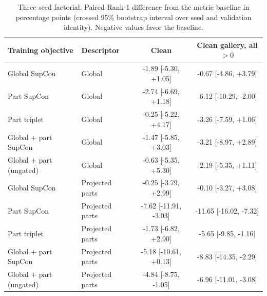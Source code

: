 \begin{table}[!htbp]
\centering
\caption{Three-seed factorial. Paired Rank-1 difference from the metric baseline in percentage points
(crossed 95\% bootstrap interval over seed and validation identity).
Negative values favor the baseline.}
\label{tab:s-factorial-paired}
\small
\setlength{\tabcolsep}{4pt}
\begin{tabularx}{\textwidth}{@{}>{\raggedright\arraybackslash}Xlcc@{}}
\toprule
Training objective & Descriptor & Clean & \shortstack{Clean gallery,\\all $>0$} \\
\midrule
Global SupCon & Global & -1.89 [-5.30, +1.05] & -0.67 [-4.86, +3.79] \\
Part SupCon & Global & -2.74 [-6.69, +1.18] & -6.12 [-10.29, -2.00] \\
Part triplet & Global & -0.25 [-5.22, +4.17] & -3.26 [-7.59, +1.06] \\
Global + part SupCon & Global & -1.47 [-5.85, +3.03] & -3.21 [-8.97, +2.89] \\
Global + part (ungated) & Global & -0.63 [-5.35, +5.30] & -2.19 [-5.35, +1.11] \\
Global SupCon & Projected parts & -0.25 [-3.79, +2.99] & -0.10 [-3.27, +3.08] \\
Part SupCon & Projected parts & -7.62 [-11.91, -3.03] & -11.65 [-16.02, -7.32] \\
Part triplet & Projected parts & -1.73 [-6.82, +2.90] & -5.65 [-9.85, -1.16] \\
Global + part SupCon & Projected parts & -5.18 [-10.61, +0.13] & -8.83 [-14.35, -2.29] \\
Global + part (ungated) & Projected parts & -4.84 [-8.75, -1.05] & -6.96 [-11.01, -3.08] \\
\bottomrule
\end{tabularx}
\vspace{0.5em}


\end{table}

